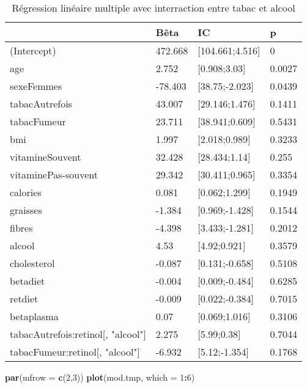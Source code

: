 \documentclass[]{article}
\newenvironment{Shaded}{\begin{snugshade}}{\end{snugshade}}
\newcommand{\KeywordTok}[1]{\textcolor[rgb]{0.13,0.29,0.53}{\textbf{#1}}}
\newcommand{\DataTypeTok}[1]{\textcolor[rgb]{0.13,0.29,0.53}{#1}}
\newcommand{\DecValTok}[1]{\textcolor[rgb]{0.00,0.00,0.81}{#1}}
\newcommand{\OperatorTok}[1]{\textcolor[rgb]{0.81,0.36,0.00}{\textbf{#1}}}
\newcommand{\NormalTok}[1]{#1}
\begin{document}
\begin{table}

\caption{\label{tab:unnamed-chunk-71}Régression linéaire multiple avec interraction entre tabac et alcool}
\centering
\begin{tabular}[t]{l|l|l|l}
\hline
  & Bêta & IC & p\\
\hline
\rowcolor[HTML]{BBD2E1}  (Intercept) & 472.668 & [104.661;4.516] & 0\\
\hline
age & 2.752 & [0.908;3.03] & 0.0027\\
\hline
\rowcolor[HTML]{BBD2E1}  sexeFemmes & -78.403 & [38.75;-2.023] & 0.0439\\
\hline
tabacAutrefois & 43.007 & [29.146;1.476] & 0.1411\\
\hline
\rowcolor[HTML]{BBD2E1}  tabacFumeur & 23.711 & [38.941;0.609] & 0.5431\\
\hline
bmi & 1.997 & [2.018;0.989] & 0.3233\\
\hline
\rowcolor[HTML]{BBD2E1}  vitamineSouvent & 32.428 & [28.434;1.14] & 0.255\\
\hline
vitaminePas-souvent & 29.342 & [30.411;0.965] & 0.3354\\
\hline
\rowcolor[HTML]{BBD2E1}  calories & 0.081 & [0.062;1.299] & 0.1949\\
\hline
graisses & -1.384 & [0.969;-1.428] & 0.1544\\
\hline
\rowcolor[HTML]{BBD2E1}  fibres & -4.398 & [3.433;-1.281] & 0.2012\\
\hline
alcool & 4.53 & [4.92;0.921] & 0.3579\\
\hline
\rowcolor[HTML]{BBD2E1}  cholesterol & -0.087 & [0.131;-0.658] & 0.5108\\
\hline
betadiet & -0.004 & [0.009;-0.484] & 0.6285\\
\hline
\rowcolor[HTML]{BBD2E1}  retdiet & -0.009 & [0.022;-0.384] & 0.7015\\
\hline
betaplasma & 0.07 & [0.069;1.016] & 0.3106\\
\hline
\rowcolor[HTML]{BBD2E1}  tabacAutrefois:retinol[, "alcool"] & 2.275 & [5.99;0.38] & 0.7044\\
\hline
tabacFumeur:retinol[, "alcool"] & -6.932 & [5.12;-1.354] & 0.1768\\
\hline
\end{tabular}
\end{table}

\begin{Shaded}
\begin{Highlighting}[]
\KeywordTok{par}\NormalTok{(}\DataTypeTok{mfrow =} \KeywordTok{c}\NormalTok{(}\DecValTok{2}\NormalTok{,}\DecValTok{3}\NormalTok{))}
\KeywordTok{plot}\NormalTok{(mod.tmp, }\DataTypeTok{which =} \DecValTok{1}\OperatorTok{:}\DecValTok{6}\NormalTok{)}
\end{Highlighting}
\end{Shaded}
\end{document}
